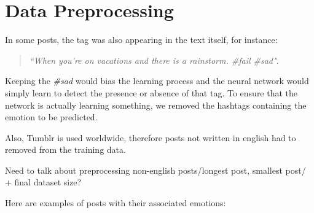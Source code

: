 \section{Data Preprocessing}
In some posts, the tag was also appearing in the text itself, for instance:
\begin{quote}
\textit{``When you're on vacations and there is a rainstorm. \#fail \#sad"}.
\end{quote}
Keeping the \textit{\#sad} would bias the learning process and the neural network would simply learn to detect the presence or absence of that tag. To ensure that the network is actually learning something, we removed the hashtags containing the emotion to be predicted.

Also, Tumblr is used worldwide, therefore posts not written in english had to removed from the training data.

Need to talk about preprocessing non-english posts/longest post, smallest post/ + final dataset size?

Here are examples of posts with their associated emotions:

